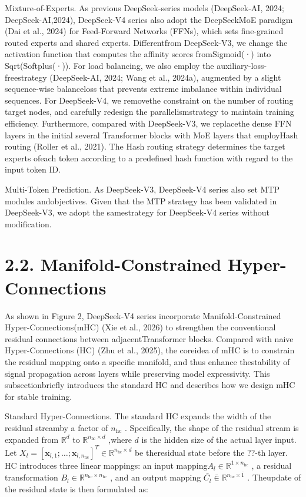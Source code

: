 \documentclass[
  10
]{article}
\begin{document}
Mixture-of-Experts. As previous DeepSeek-series models (DeepSeek-AI,
2024; DeepSeek-AI,2024), DeepSeek-V4 series also adopt the DeepSeekMoE
paradigm (Dai et al., 2024) for Feed-Forward Networks (FFNs), which sets
fine-grained routed experts and shared experts. Differentfrom
DeepSeek-V3, we change the activation function that computes the
affinity scores fromSigmoid(·) into Sqrt(Softplus(·)). For load
balancing, we also employ the auxiliary-loss-freestrategy (DeepSeek-AI,
2024; Wang et al., 2024a), augmented by a slight sequence-wise
balanceloss that prevents extreme imbalance within individual sequences.
For DeepSeek-V4, we removethe constraint on the number of routing target
nodes, and carefully redesign the parallelismstrategy to maintain
training efficiency. Furthermore, compared with DeepSeek-V3, we
replacethe dense FFN layers in the initial several Transformer blocks
with MoE layers that employHash routing (Roller et al., 2021). The Hash
routing strategy determines the target experts ofeach token according to
a predefined hash function with regard to the input token ID.

Multi-Token Prediction. As DeepSeek-V3, DeepSeek-V4 series also set MTP
modules andobjectives. Given that the MTP strategy has been validated in
DeepSeek-V3, we adopt the samestrategy for DeepSeek-V4 series without
modification.

\section{2.2. Manifold-Constrained
Hyper-Connections}\label{manifold-constrained-hyper-connections}

As shown in Figure 2, DeepSeek-V4 series incorporate
Manifold-Constrained Hyper-Connections(mHC) (Xie et al., 2026) to
strengthen the conventional residual connections between
adjacentTransformer blocks. Compared with naive Hyper-Connections (HC)
(Zhu et al., 2025), the coreidea of mHC is to constrain the residual
mapping onto a specific manifold, and thus enhance thestability of
signal propagation across layers while preserving model expressivity.
This subsectionbriefly introduces the standard HC and describes how we
design mHC for stable training.

Standard Hyper-Connections. The standard HC expands the width of the
residual streamby a factor of \(n _ { \mathrm { h c } }\) .
Specifically, the shape of the residual stream is expanded from
\(\mathbb { R } ^ { d }\) to
\(\mathbb { R } ^ { n _ { \mathrm { h c } } \times d }\) ,where \(d\) is
the hidden size of the actual layer input. Let
\(X _ { l } = [ \mathbf { x } _ { l , 1 } ; \ldots ; \mathbf { x } _ { l , n _ { \mathrm { h c } } } ] ^ { T } \in \mathbb { R } ^ { n _ { \mathrm { h c } } \times d }\)
be theresidual state before the ??-th layer. HC introduces three linear
mappings: an input
mapping\(A _ { l } \in \mathbb { R } ^ { 1 \times n _ { \mathrm { h c } } }\)
, a residual transformation
\(B _ { l } \in \mathbb { R } ^ { n _ { \mathrm { h c } } \times n _ { \mathrm { h c } } }\)
, and an output mapping
\(\bar { C _ { l } } \bar { \in } \mathbb { R } ^ { n _ { \mathrm { h c } } \times \bar { 1 } }\)
. Theupdate of the residual state is then formulated as:
\end{document}
